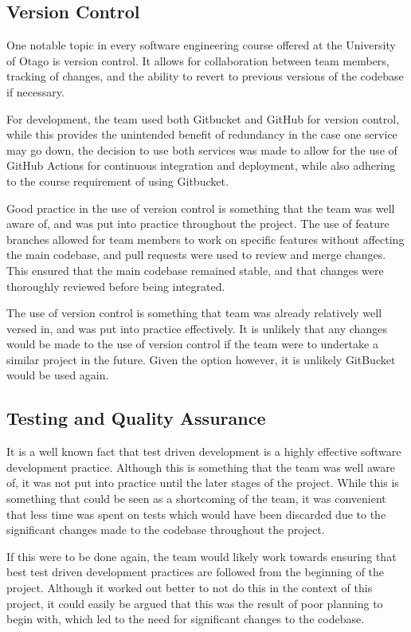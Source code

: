 \documentclass[conference]{IEEEtran}
\begin{document}
\subsection{Version Control}
One notable topic in every software engineering course offered at the University of Otago is version control. It allows for collaboration between team members, tracking of changes, and the ability to revert to previous versions of the codebase if necessary.

For development, the team used both Gitbucket and GitHub for version control, while this provides the unintended benefit of redundancy in the case one service may go down, the decision to use both services was made to allow for the use of GitHub Actions for continuous integration and deployment, while also adhering to the course requirement of using Gitbucket.

Good practice in the use of version control is something that the team was well aware of, and was put into practice throughout the project. The use of feature branches allowed for team members to work on specific features without affecting the main codebase, and pull requests were used to review and merge changes. This ensured that the main codebase remained stable, and that changes were thoroughly reviewed before being integrated.

The use of version control is something that team was already relatively well versed in, and was put into practice effectively. It is unlikely that any changes would be made to the use of version control if the team were to undertake a similar project in the future. Given the option however, it is unlikely GitBucket would be used again.

\subsection{Testing and Quality Assurance}
It is a well known fact that test driven development is a highly effective software development practice. Although this is something that the team was well aware of, it was not put into practice until the later stages of the project. While this is something that could be seen as a shortcoming of the team, it was convenient that less time was spent on tests which would have been discarded due to the significant changes made to the codebase throughout the project.

If this were to be done again, the team would likely work towards ensuring that best test driven development practices are followed from the beginning of the project. Although it worked out better to not do this in the context of this project, it could easily be argued that this was the result of poor planning to begin with, which led to the need for significant changes to the codebase.
\end{document}
